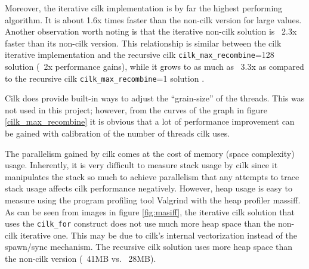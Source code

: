 Moreover, the iterative cilk implementation is by far the highest performing algorithm. It is about 1.6x times faster than the non-cilk version for large values. Another observation worth noting is that the iterative non-cilk solution is ~2.3x faster than its non-cilk version. This relationship is similar between the cilk iterative implementation and the recursive cilk \texttt{cilk\_max\_recombine}=128 solution (~2x performance gains), while it grows to as much as ~3.3x as compared to the recursive cilk \texttt{cilk\_max\_recombine}=1 solution . 

Cilk does provide built-in ways to adjust the “grain-size” of the threads. This was not used in this project; however, from the curves of the graph in figure \ref{cilk_max_recombine} it is obvious that a lot of performance improvement can be gained with calibration of the number of threads cilk uses. 

The parallelism gained by cilk comes at the cost of memory (space complexity) usage. Inherently, it is very difficult to measure stack usage by cilk since it manipulates the stack so much to achieve parallelism that any attempts to trace stack usage affects cilk performance negatively. However, heap usage is easy to measure using the program profiling tool Valgrind with the heap profiler massiff. As can be seen from images in figure \ref{fig:masiff}, the iterative cilk solution that uses the \texttt{cilk\_for} construct does not use much more heap space than the non-cilk iterative one. This may be due to cilk’s internal vectorization instead of the spawn/sync mechanism. The recursive cilk solution uses more heap space than the non-cilk version (~41MB vs. ~28MB). 

